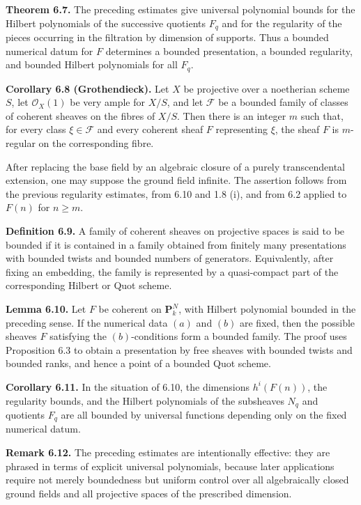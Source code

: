 \documentclass[11pt]{article}
\begin{document}
\textbf{Theorem 6.7.} The preceding estimates give universal polynomial bounds for the Hilbert polynomials of the successive quotients $F_q$ and for the regularity of the pieces occurring in the filtration by dimension of supports. Thus a bounded numerical datum for $F$ determines a bounded presentation, a bounded regularity, and bounded Hilbert polynomials for all $F_q$.

\textbf{Corollary 6.8 (Grothendieck).} Let $X$ be projective over a noetherian scheme $S$, let $\mathcal O_X(1)$ be very ample for $X/S$, and let $\mathcal F$ be a bounded family of classes of coherent sheaves on the fibres of $X/S$. Then there is an integer $m$ such that, for every class $\xi\in\mathcal F$ and every coherent sheaf $F$ representing $\xi$, the sheaf $F$ is $m$-regular on the corresponding fibre.

After replacing the base field by an algebraic closure of a purely transcendental extension, one may suppose the ground field infinite. The assertion follows from the previous regularity estimates, from 6.10 and 1.8 (i), and from 6.2 applied to $F(n)$ for $n\ge m$.

\textbf{Definition 6.9.} A family of coherent sheaves on projective spaces is said to be bounded if it is contained in a family obtained from finitely many presentations with bounded twists and bounded numbers of generators. Equivalently, after fixing an embedding, the family is represented by a quasi-compact part of the corresponding Hilbert or Quot scheme.

\textbf{Lemma 6.10.} Let $F$ be coherent on $\mathbf P^N_k$, with Hilbert polynomial bounded in the preceding sense. If the numerical data $(a)$ and $(b)$ are fixed, then the possible sheaves $F$ satisfying the $(b)$-conditions form a bounded family. The proof uses Proposition 6.3 to obtain a presentation by free sheaves with bounded twists and bounded ranks, and hence a point of a bounded Quot scheme.

\textbf{Corollary 6.11.} In the situation of 6.10, the dimensions $h^i(F(n))$, the regularity bounds, and the Hilbert polynomials of the subsheaves $N_q$ and quotients $F_q$ are all bounded by universal functions depending only on the fixed numerical datum.

\textbf{Remark 6.12.} The preceding estimates are intentionally effective: they are phrased in terms of explicit universal polynomials, because later applications require not merely boundedness but uniform control over all algebraically closed ground fields and all projective spaces of the prescribed dimension.
\end{document}
